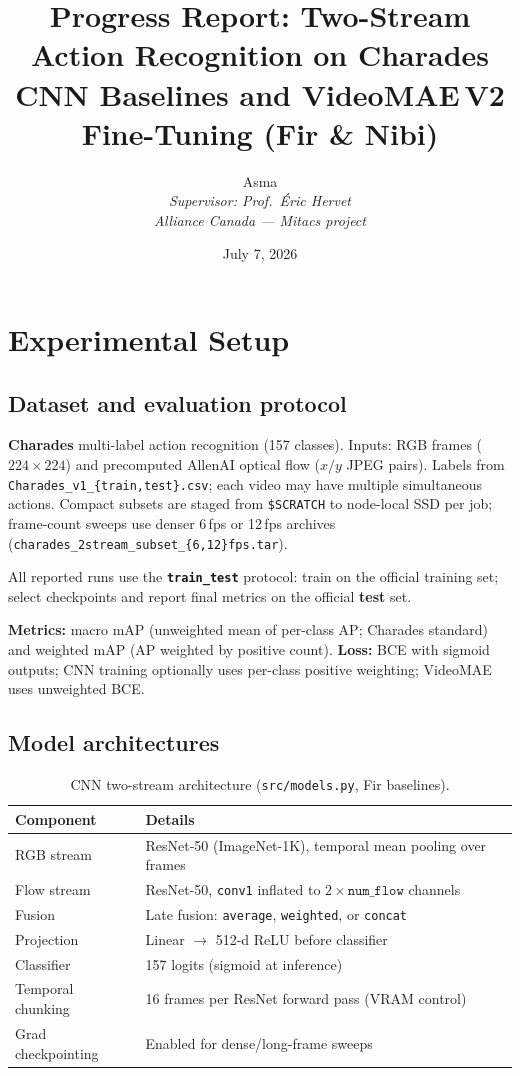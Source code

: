 \documentclass[11pt,a4paper]{article}
\title{%
  \textbf{Progress Report: Two-Stream Action Recognition on Charades}\\[0.4em]
  \large CNN Baselines and VideoMAE\,V2 Fine-Tuning (Fir \& Nibi)
}
\author{Asma\\
  \textit{Supervisor: Prof.\ \'Eric Hervet}\\
  \textit{Alliance Canada --- Mitacs project}}
\date{July 7, 2026}
\begin{document}
\maketitle

\section{Experimental Setup}

\subsection{Dataset and evaluation protocol}

\textbf{Charades} multi-label action recognition (157 classes). Inputs: RGB frames
($224\times224$) and precomputed AllenAI optical flow ($x/y$ JPEG pairs). Labels from
\texttt{Charades\_v1\_\{train,test\}.csv}; each video may have multiple simultaneous
actions. Compact subsets are staged from \texttt{\$SCRATCH} to node-local SSD per job;
frame-count sweeps use denser 6\,fps or 12\,fps archives
(\texttt{charades\_2stream\_subset\_\{6,12\}fps.tar}).

All reported runs use the \textbf{\texttt{train\_test}} protocol: train on the official
training set; select checkpoints and report final metrics on the official \textbf{test}
set. 

\textbf{Metrics:} macro mAP (unweighted mean of per-class AP; Charades standard) and
weighted mAP (AP weighted by positive count). \textbf{Loss:} BCE with sigmoid outputs;
CNN training optionally uses per-class positive weighting; VideoMAE uses unweighted BCE.

\subsection{Model architectures}

\begin{table}[h]
\centering
\caption{CNN two-stream architecture (\texttt{src/models.py}, Fir baselines).}
\begin{tabular}{@{}ll@{}}
\toprule
Component & Details \\
\midrule
RGB stream & ResNet-50 (ImageNet-1K), temporal mean pooling over frames \\
Flow stream & ResNet-50, \texttt{conv1} inflated to $2 \times \texttt{num\_flow}$ channels \\
Fusion & Late fusion: \texttt{average}, \texttt{weighted}, or \texttt{concat} \\
Projection & Linear $\rightarrow$ 512-d ReLU before classifier \\
Classifier & 157 logits (sigmoid at inference) \\
Temporal chunking & 16 frames per ResNet forward pass (VRAM control) \\
Grad checkpointing & Enabled for dense/long-frame sweeps \\
\bottomrule
\end{tabular}
\end{table}
\end{document}
